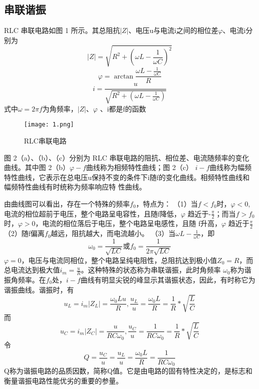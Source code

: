 \documentclass[11pt,a4paper]{article}
\begin{document}
\subsection{串联谐振}
RLC 串联电路如图 1 所示。其总阻抗$\left\lvert Z\right\rvert $、电压u与电流i之间的相位差$\varphi $、电流i分别为
\begin{equation}
    \left\lvert Z\right\rvert=\sqrt{R^2+(\omega L-\frac{1}{\omega C} )^2}  
\end{equation}
\begin{equation}
    \varphi =\arctan \frac{\omega L-\frac{1}{\omega C} }{R} 
\end{equation}
\begin{equation}
   i= \frac{u}{\sqrt{R^2+(\omega L-\frac{1}{\omega C} )} } 
\end{equation}
式中$\omega =2\pi f$为角频率，$\left\lvert Z\right\rvert $、$\varphi$ 、i都是f的函数
\begin{figure}[H]
    \centering
    \texttt{[image: 1.png]}
    \caption{RLC串联电路}
\end{figure}
图 2（a）、（b）、（c）分别为 RLC 串联电路的阻抗、相位差、电流随频率的变化曲线。其中图 2（b）$\varphi -f$曲线称为相频特性曲线；图 2（c）
$i-f$曲线称为幅频特性曲线，它表示在总电压u保持不变的条件下i随f的变化曲线。相频特性曲线和幅频特性曲线有时统称为频率响应特
性曲线。

由曲线图可以看出，存在一个特殊的频率$f_0$，特点为：
（1）当$f<f_0$时，$\varphi <0$,电流的相位超前于电压，整个电路呈电容性，且随f降低，$\varphi$ 趋近于-$\frac{\pi }{2}$；而当$f>f_0$时，$\varphi >0$，电流的相位落后于电压，整个电路呈电感性，且随
f升高，$\varphi$ 趋近于$\frac{\pi }{2}$
（2）随f偏离$f_0$越远，阻抗越大，而电流越小。
（3）当$\omega L-\frac{1}{\omega C}$，即
\begin{equation}
    \omega _0=\frac{1}{\sqrt{LC} } 或 f_0=\frac{1}{2\pi \sqrt{LC} }
\end{equation}
$\varphi  = 0$，电压与电流同相位，整个电路呈纯电阻性，总阻抗达到极小值$Z_0=R$，而总电流达到极大值$i_m=\frac{u}{R}$。这种特殊的状态称为串联谐振，此时角频率
$\omega _0$称为谐振角频率。在$f_0$处，$i − f$曲线有明显尖锐的峰显示其谐振状态，因此，有时称它为谐振曲线。谐振时，有
\begin{equation}
    u_L=i_m\left\lvert Z_L\right\rvert =\frac{{\omega _0}Lu}{R},\frac{u_L}{u}=\frac{{\omega _0}L}{R}=\frac{1}{R}*\sqrt{\frac{L}{C}}
\end{equation}
而
\begin{equation}
    u_C=i_m\left\lvert Z_C\right\rvert =\frac{u}{RC{\omega _0}},\frac{u_C}{u}=\frac{1}{RC{\omega _0}}=\frac{1}{R}*\sqrt{\frac{L}{C}}
\end{equation}
令
\begin{equation}
    Q=\frac{u_C}{u}=\frac{u_L}{u}=\frac{{\omega _0}L}{R}=\frac{1}{RC{\omega _0}}
\end{equation}
Q称为谐振电路的品质因数，简称Q值。它是由电路的固有特性决定的，是标志和衡量谐振电路性能优劣的重要的参量。
\end{document}
